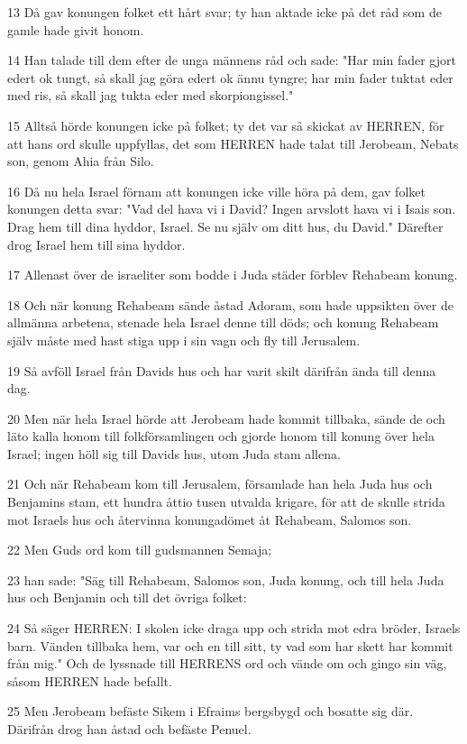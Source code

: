 \par 13 Då gav konungen folket ett hårt svar; ty han aktade icke på det råd som de gamle hade givit honom.
\par 14 Han talade till dem efter de unga männens råd och sade: "Har min fader gjort edert ok tungt, så skall jag göra edert ok ännu tyngre; har min fader tuktat eder med ris, så skall jag tukta eder med skorpiongissel."
\par 15 Alltså hörde konungen icke på folket; ty det var så skickat av HERREN, för att hans ord skulle uppfyllas, det som HERREN hade talat till Jerobeam, Nebats son, genom Ahia från Silo.
\par 16 Då nu hela Israel förnam att konungen icke ville höra på dem, gav folket konungen detta svar: "Vad del hava vi i David? Ingen arvslott hava vi i Isais son. Drag hem till dina hyddor, Israel. Se nu själv om ditt hus, du David." Därefter drog Israel hem till sina hyddor.
\par 17 Allenast över de israeliter som bodde i Juda städer förblev Rehabeam konung.
\par 18 Och när konung Rehabeam sände åstad Adoram, som hade uppsikten över de allmänna arbetena, stenade hela Israel denne till döds; och konung Rehabeam själv måste med hast stiga upp i sin vagn och fly till Jerusalem.
\par 19 Så avföll Israel från Davids hus och har varit skilt därifrån ända till denna dag.
\par 20 Men när hela Israel hörde att Jerobeam hade kommit tillbaka, sände de och läto kalla honom till folkförsamlingen och gjorde honom till konung över hela Israel; ingen höll sig till Davids hus, utom Juda stam allena.
\par 21 Och när Rehabeam kom till Jerusalem, församlade han hela Juda hus och Benjamins stam, ett hundra åttio tusen utvalda krigare, för att de skulle strida mot Israels hus och återvinna konungadömet åt Rehabeam, Salomos son.
\par 22 Men Guds ord kom till gudsmannen Semaja;
\par 23 han sade: "Säg till Rehabeam, Salomos son, Juda konung, och till hela Juda hus och Benjamin och till det övriga folket:
\par 24 Så säger HERREN: I skolen icke draga upp och strida mot edra bröder, Israels barn. Vänden tillbaka hem, var och en till sitt, ty vad som har skett har kommit från mig." Och de lyssnade till HERRENS ord och vände om och gingo sin väg, såsom HERREN hade befallt.
\par 25 Men Jerobeam befäste Sikem i Efraims bergsbygd och bosatte sig där. Därifrån drog han åstad och befäste Penuel.
